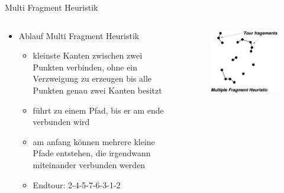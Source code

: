 \begin{frame}{Multi Fragment Heuristik}    
  \begin{columns}
	  \begin{column}{0.5\textwidth}
	\begin{itemize}
		\item Ablauf Multi Fragment Heuristik
            \begin{itemize}
        		\item kleinste Kanten zwischen zwei Punkten verbinden, ohne ein 						  Verzweigung zu erzeugen bis alle Punkten genau zwei Kanten besitzt
                \item führt zu einem Pfad, bis er am ende verbunden wird
                \item am anfang können mehrere kleine Pfade entstehen, die irgendwann 						miteinander verbunden werden
                \item Endtour: 2-4-5-7-6-3-1-2
            \end{itemize}
	\end{itemize}
	  \end{column}
      \begin{column}{0.5\textwidth}
      	\vspace{0.0cm}
        \begin{figure} 
        	\includegraphics[scale=0.30]{Multi_fragment_2.png}\\
                  	\vspace{1.0cm}

\end{figure}
\end{column}
\end{columns}
\end{frame}
